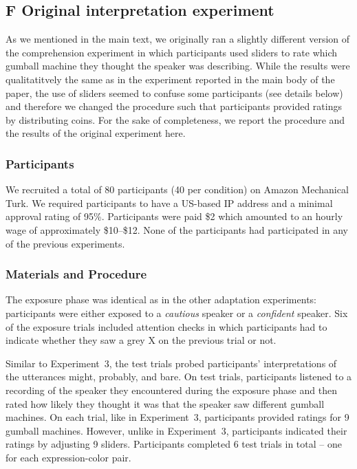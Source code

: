\documentclass[man, floatsintext]{apa6}
\begin{document}
\pagebreak
\FloatBarrier



\subsection*{F Original interpretation experiment}

As we mentioned in the main text, we originally ran a slightly different version of the comprehension experiment in which participants used sliders to rate which gumball machine they thought the speaker was describing. While the results were qualitatitvely the same as in the experiment reported in the main body of the paper, the use of sliders seemed to confuse some participants (see details below) and therefore we changed the procedure such that participants provided ratings by distributing coins. For the sake of completeness, we report the 
procedure and the results of the original experiment here.

\subsubsection*{Participants}

We recruited a total of 80 participants (40 per condition) on Amazon Mechanical Turk. We required participants to have a US-based IP address and a minimal approval rating of 95\%. Participants were paid \$2 which amounted to an hourly wage of approximately \$10--\$12. None of the participants had participated in any of the previous experiments. 

\subsubsection*{Materials and Procedure}

The exposure phase was identical as in the other adaptation experiments: participants were either exposed to a 
\textit{cautious} speaker or a \textit{confident} speaker. Six of the exposure trials included attention checks in which
participants had to indicate whether they saw a grey X on the previous trial or not.

Similar to Experiment~3, the test trials probed participants'
interpretations of the utterances {\sc might}, {\sc probably}, and {\sc bare}. On test trials, participants listened
to a recording of the speaker they encountered during the exposure phase and then rated how likely they
thought it was that the speaker saw different gumball machines. On each trial, like in Experiment~3, participants
provided ratings for 9 gumball machines. However, unlike in Experiment~3, participants indicated their ratings
by adjusting 9 sliders. Participants completed 6 test trials in total -- one for each expression-color pair.
\end{document}

